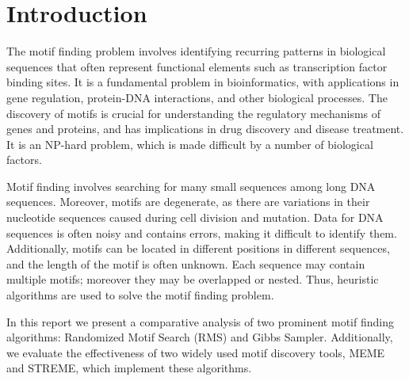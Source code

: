 \section{Introduction}

The motif finding problem involves identifying recurring patterns in biological sequences that often represent functional elements such as transcription factor binding sites. It is a fundamental problem in bioinformatics, with applications in gene regulation, protein-DNA interactions, and other biological processes. The discovery of motifs is crucial for understanding the regulatory mechanisms of genes
and proteins, and has implications in drug discovery and disease treatment. It is an NP-hard problem, which is made difficult by a number of biological factors.

Motif finding involves searching for many small sequences among long DNA sequences. Moreover, motifs are degenerate, as there are variations in their nucleotide sequences caused during cell division and mutation. Data for DNA sequences is often noisy and contains errors, making it difficult to identify them. Additionally, motifs can be located in different positions in different sequences, and the length of the motif is often unknown. Each sequence may contain multiple motifs; moreover they may be overlapped or nested. Thus, heuristic algorithms are used to solve the motif finding problem.

In this report we present a comparative analysis of two prominent motif finding algorithms: Randomized Motif Search (RMS) and Gibbs Sampler. Additionally, we evaluate the effectiveness of two widely used motif discovery tools, MEME and STREME, which implement these algorithms.
